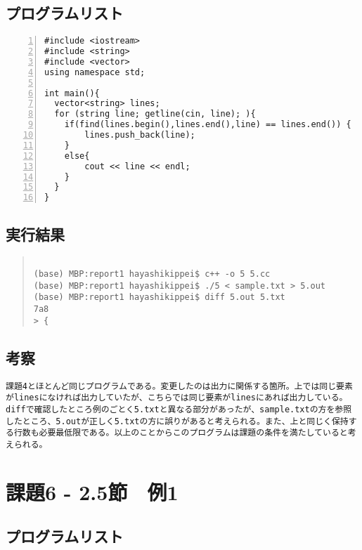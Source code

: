 \documentclass[11pt,a4paper]{jsarticle}
\begin{document}
\subsection{プログラムリスト}
\label{sec:prog-list2}

\begin{lstlisting}[numbers=left,numberstyle=\ttfamily,xleftmargin=2zw]
#include <iostream>
#include <string>
#include <vector>
using namespace std;

int main(){
  vector<string> lines;
  for (string line; getline(cin, line); ){
    if(find(lines.begin(),lines.end(),line) == lines.end()) {
        lines.push_back(line);
    }
    else{
        cout << line << endl;
    }
  }
}
\end{lstlisting}
%
\subsection{実行結果}
\begin{quote}           %
\begin{verbatim}

(base) MBP:report1 hayashikippei$ c++ -o 5 5.cc
(base) MBP:report1 hayashikippei$ ./5 < sample.txt > 5.out
(base) MBP:report1 hayashikippei$ diff 5.out 5.txt
7a8
> {

\end{verbatim}
\end{quote}
%
\subsection{考察}
\begin{verbatim}
課題4とほとんど同じプログラムである。変更したのは出力に関係する箇所。上では同じ要素がlinesになければ出力していたが、こちらでは同じ要素がlinesにあれば出力している。diffで確認したところ例のごとく5.txtと異なる部分があったが、sample.txtの方を参照したところ、5.outが正しく5.txtの方に誤りがあると考えられる。また、上と同じく保持する行数も必要最低限である。以上のことからこのプログラムは課題の条件を満たしていると考えられる。
\end{verbatim}

%
\section{課題6 - 2.5節　例1}
\subsection{プログラムリスト}
\label{sec:prog-list2}
\end{document}
